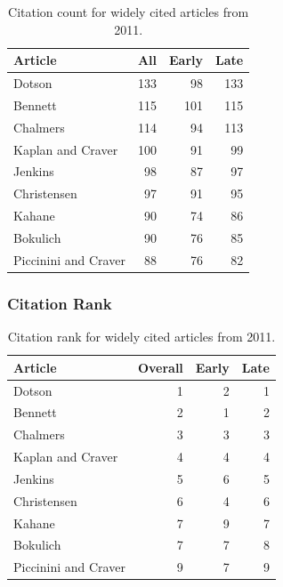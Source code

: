 \documentclass[
  10pt,
  letterpaper,
  DIV=11,
  numbers=noendperiod,
  twoside]{scrartcl}
\begin{document}
\begin{longtable}[]{@{}lrrr@{}}

\caption{\label{tbl-citation-count-2011}Citation count for widely cited
articles from 2011.}

\tabularnewline

\toprule\noalign{}
Article & All & Early & Late \\
\midrule\noalign{}
\endhead
\bottomrule\noalign{}
\endlastfoot
Dotson & 133 & 98 & 133 \\
Bennett & 115 & 101 & 115 \\
Chalmers & 114 & 94 & 113 \\
Kaplan and Craver & 100 & 91 & 99 \\
Jenkins & 98 & 87 & 97 \\
Christensen & 97 & 91 & 95 \\
Kahane & 90 & 74 & 86 \\
Bokulich & 90 & 76 & 85 \\
Piccinini and Craver & 88 & 76 & 82 \\

\end{longtable}

\subsubsection*{Citation Rank}\label{citation-rank-35}

\begin{longtable}[]{@{}lrrr@{}}

\caption{\label{tbl-citation-rank-2011}Citation rank for widely cited
articles from 2011.}

\tabularnewline

\toprule\noalign{}
Article & Overall & Early & Late \\
\midrule\noalign{}
\endhead
\bottomrule\noalign{}
\endlastfoot
Dotson & 1 & 2 & 1 \\
Bennett & 2 & 1 & 2 \\
Chalmers & 3 & 3 & 3 \\
Kaplan and Craver & 4 & 4 & 4 \\
Jenkins & 5 & 6 & 5 \\
Christensen & 6 & 4 & 6 \\
Kahane & 7 & 9 & 7 \\
Bokulich & 7 & 7 & 8 \\
Piccinini and Craver & 9 & 7 & 9 \\

\end{longtable}
\end{document}
